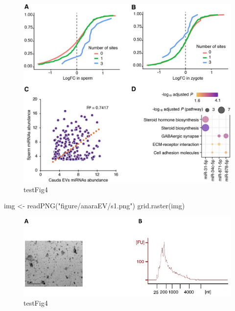 \documentclass[12pt,twoside]{reedthesis}
\newenvironment{Shaded}{\begin{snugshade}}{\end{snugshade}}
\newcommand{\FunctionTok}[1]{\textcolor[rgb]{0.00,0.00,0.00}{#1}}
\newcommand{\NormalTok}[1]{#1}
\newcommand{\OtherTok}[1]{\textcolor[rgb]{0.56,0.35,0.01}{#1}}
\newcommand{\StringTok}[1]{\textcolor[rgb]{0.31,0.60,0.02}{#1}}
\begin{document}
\begin{figure}

{\centering \includegraphics{thesis_files/figure-latex/fig4-1} 

}

\caption{testFig4}\label{fig:fig4}
\end{figure}
\begin{Shaded}
\begin{Highlighting}[]
\NormalTok{img }\OtherTok{\textless{}{-}} \FunctionTok{readPNG}\NormalTok{(}\StringTok{"figure/anaraEV/s1.png"}\NormalTok{)}
\FunctionTok{grid.raster}\NormalTok{(img)}
\end{Highlighting}
\end{Shaded}
\begin{figure}

{\centering \includegraphics{thesis_files/figure-latex/sfig1-1} 

}

\caption{testFig4}\label{fig:sfig1}
\end{figure}
\end{document}
